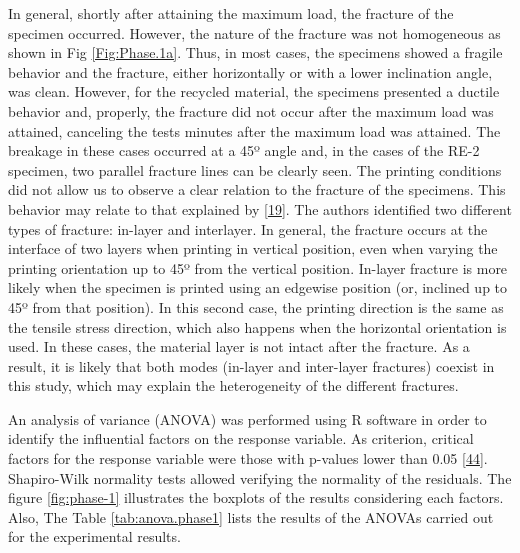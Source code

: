 \documentclass[conference,final,]{IEEEtran}
\begin{document}
In general, shortly after attaining the maximum load, the fracture of
the specimen occurred. However, the nature of the fracture was not
homogeneous as shown in Fig \ref{Fig:Phase.1a}. Thus, in most cases, the
specimens showed a fragile behavior and the fracture, either
horizontally or with a lower inclination angle, was clean. However, for
the recycled material, the specimens presented a ductile behavior and,
properly, the fracture did not occur after the maximum load was
attained, canceling the tests minutes after the maximum load was
attained. The breakage in these cases occurred at a 45º angle and, in
the cases of the RE-2 specimen, two parallel fracture lines can be
clearly seen. The printing conditions did not allow us to observe a
clear relation to the fracture of the specimens. This behavior may
relate to that explained by \protect\hyperlink{ref-Yao2019}{{[}19{]}}.
The authors identified two different types of fracture: in-layer and
interlayer. In general, the fracture occurs at the interface of two
layers when printing in vertical position, even when varying the
printing orientation up to 45º from the vertical position. In-layer
fracture is more likely when the specimen is printed using an edgewise
position (or, inclined up to 45º from that position). In this second
case, the printing direction is the same as the tensile stress
direction, which also happens when the horizontal orientation is used.
In these cases, the material layer is not intact after the fracture. As
a result, it is likely that both modes (in-layer and inter-layer
fractures) coexist in this study, which may explain the heterogeneity of
the different fractures.

An analysis of variance (ANOVA) was performed using R software in order
to identify the influential factors on the response variable. As
criterion, critical factors for the response variable were those with
p-values lower than 0.05 \protect\hyperlink{ref-Perez2018}{{[}44{]}}.
Shapiro-Wilk normality tests allowed verifying the normality of the
residuals. The figure \ref{fig:phase-1} illustrates the boxplots of the
results considering each factors. Also, The Table \ref{tab:anova.phase1}
lists the results of the ANOVAs carried out for the experimental
results.
\end{document}
